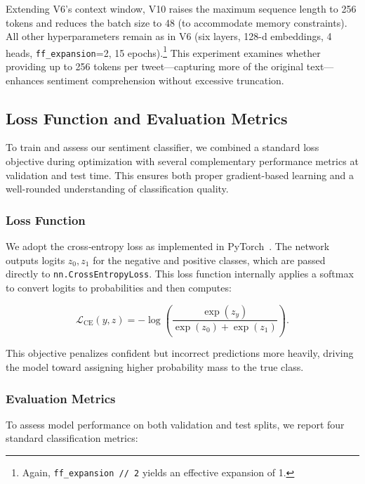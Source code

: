 \documentclass[twocolumn,superscriptaddress,aps]{revtex4-1}
\begin{document}
Extending V6’s context window, V10 raises the maximum sequence length to 256 tokens and reduces the batch size to 48 (to accommodate memory constraints). All other hyperparameters remain as in V6 (six layers, 128-d embeddings, 4 heads, \texttt{ff\_expansion}=2, 15 epochs).\footnote{Again, \texttt{ff\_expansion // 2} yields an effective expansion of 1.}  
This experiment examines whether providing up to 256 tokens per tweet—capturing more of the original text—enhances sentiment comprehension without excessive truncation.  

\subsection{Loss Function and Evaluation Metrics}
\label{subsec:loss}

To train and assess our sentiment classifier, we combined a standard loss objective during optimization with several complementary performance metrics at validation and test time.  This ensures both proper gradient-based learning and a well-rounded understanding of classification quality.

\subsubsection{Loss Function}

We adopt the cross‐entropy loss as implemented in PyTorch~\cite{pytorchCrossEntropy}. The network outputs logits $z_{0}, z_{1}$ for the negative and positive classes, which are passed directly to \texttt{nn.CrossEntropyLoss}. This loss function internally applies a softmax to convert logits to probabilities and then computes:

\[
\mathcal{L}_{\mathrm{CE}}(y, z)
= -\log\left(\frac{\exp(z_y)}{\exp(z_0) + \exp(z_1)}\right).
\]

This objective penalizes confident but incorrect predictions more heavily, driving the model toward assigning higher probability mass to the true class.

\subsubsection{Evaluation Metrics}

To assess model performance on both validation and test splits, we report four standard classification metrics:
\end{document}

